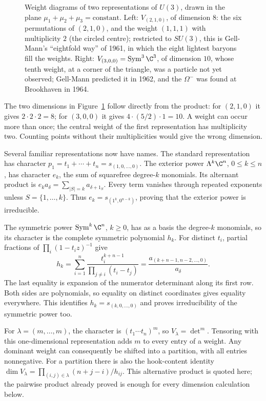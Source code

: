 \begin{figure}[ht]
\centering
{}
\caption{Weight diagrams of two representations of $U(3)$, drawn in the plane $\mu_1+\mu_2+\mu_3=\text{constant}$. Left: $V_{(2,1,0)}$, of dimension $8$: the six permutations of $(2,1,0)$, and the weight $(1,1,1)$ with multiplicity $2$ (the circled centre); restricted to $SU(3)$,
this is Gell-Mann's ``eightfold way'' of 1961, in which the eight lightest baryons fill the weights. Right: $V_{(3,0,0)}=\operatorname{Sym}^3\C^3$, of dimension $10$, whose tenth weight, at a corner of the triangle, was a particle not yet observed; Gell-Mann
predicted it in 1962, and the $\Omega^-$ was found at Brookhaven in 1964.}
\label{fig:weights}
\end{figure}

The two dimensions in Figure~\ref{fig:weights} follow directly from the product: for $(2,1,0)$ it gives $2\cdot2\cdot2=8$; for $(3,0,0)$ it gives $4\cdot(5/2)\cdot1=10$. A weight can occur more than once; the central weight of the first representation has multiplicity two. Counting points without their multiplicities would give the wrong dimension.

Several familiar representations now have names. The standard representation has character $p_1=t_1+\cdots+t_n=s_{(1,0,\ldots,0)}$. The exterior power $\Lambda^k\C^n$, $0\le k\le n$, has character $e_k$, the sum of squarefree degree-$k$ monomials. Its alternant product is
$e_k a_\delta=\sum_{|S|=k}a_{\delta+1_S}$.
Every term vanishes through repeated exponents unless $S=\{1,\ldots,k\}$. Thus $e_k=s_{(1^k,0^{n-k})}$, proving that the exterior power is irreducible.

The symmetric power $\operatorname{Sym}^k\C^n$, $k\ge0$, has as a basis the degree-$k$ monomials, so its character is the complete symmetric polynomial $h_k$. For distinct $t_i$, partial fractions of $\prod_i(1-t_i z)^{-1}$ give
\[
h_k=\sum_{i=1}^n\frac{t_i^{k+n-1}}{\prod_{j\ne i}(t_i-t_j)}
=\frac{a_{(k+n-1,n-2,\ldots,0)}}{a_\delta}.
\]
The last equality is expansion of the numerator determinant along its first row. Both sides are polynomials, so equality on distinct coordinates gives equality everywhere. This identifies $h_k=s_{(k,0,\ldots,0)}$ and proves irreducibility of the symmetric power too.

For $\lambda=(m,\ldots,m)$, the character is $(t_1\cdots t_n)^m$, so $V_\lambda=\det^m$. Tensoring with this one-dimensional representation adds $m$ to every entry of a weight. Any dominant weight can consequently be shifted into a partition, with all entries nonnegative. For a partition there is also the hook-content identity
$\dim V_\lambda=\prod_{(i,j)\in\lambda}(n+j-i)/h_{ij}$.
This alternative product is quoted here; the pairwise product already proved is enough for every dimension calculation below.

